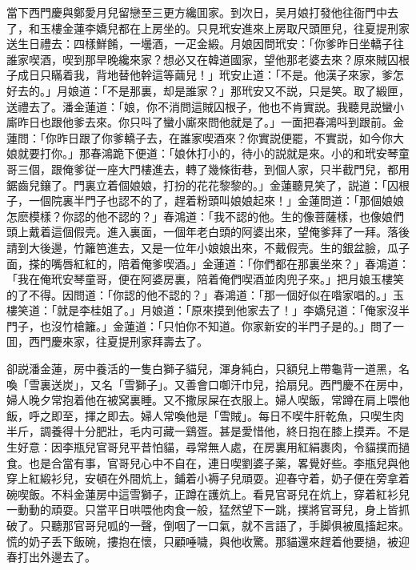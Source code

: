 當下西門慶與鄭愛月兒留戀至三更方纔囬家。到次日，吴月娘打發他往衙門中去了，和玉樓金蓮李嬌兒都在上房坐的。只見玳安進來上房取尺頭匣兒，往夏提刑家送生日禮去：四樣鮮餚，一壜酒，一疋金緞。月娘因問玳安：「你爹昨日坐轎子往誰家喫酒，喫到那早晚纔來家？想必又在韓道國家，望他那老婆去來？原來賊囚根子成日只瞞着我，背地替他幹這等繭兒！」玳安止道：「不是。他漢子來家，爹怎好去的。」月娘道：「不是那裏，却是誰家？」那玳安又不説，只是笑。取了緞匣，送禮去了。潘金蓮道：「娘，你不消問這賊囚根子，他也不肯實説。我聽見説蠻小廝昨日也跟他爹去來。你只呌了蠻小廝來問他就是了。」一面把春鴻呌到跟前。金蓮問：「你昨日跟了你爹轎子去，在誰家喫酒來？你實説便罷，不實説，如今你大娘就要打你。」那春鴻跪下便道：「娘休打小的，待小的説就是來。小的和玳安琴童哥三個，跟俺爹従一座大門樓進去，轉了幾條街巷，到個人家，只半截門兒，都用鋸齒兒鑲了。門裏立着個娘娘，打扮的花花黎黎的。」金蓮聽見笑了，説道：「囚根子，一個院裏半門子也認不的了，趕着粉頭叫娘娘起來！」金蓮問道：「那個娘娘怎麽模樣？你認的他不認的？」春鴻道：「我不認的他。生的像菩薩樣，也像娘們頭上戴着這個假壳。進入裏面，一個年老白頭的阿婆出來，望俺爹拜了一拜。落後請到大後邊，竹籬笆進去，又是一位年小娘娘出來，不戴假壳。生的銀盆臉，瓜子面，搽的嘴唇紅紅的，陪着俺爹喫酒。」金蓮道：「你們都在那裏坐來？」春鴻道：「我在俺玳安琴童哥，便在阿婆房裏，陪着俺們喫酒並肉兜子來。」把月娘玉樓笑的了不得。因問道：「你認的他不認的？」春鴻道：「那一個好似在喒家唱的。」玉樓笑道：「就是李桂姐了。」月娘道：「原來摸到他家去了！」李嬌兒道：「俺家沒半門子，也沒竹槍籬。」金蓮道：「只怕你不知道。你家新安的半門子是的。」問了一囬，西門慶來家，往夏提刑家拜壽去了。

卻説潘金蓮，房中養活的一隻白獅子貓兒，渾身純白，只額兒上帶龜背一道黑，名喚「雪裏送炭」，又名「雪獅子」。又善會口啣汗巾兒，拾扇兒。西門慶不在房中，婦人晚夕常抱着他在被窝裏睡。又不撒尿屎在衣服上。婦人喫飯，常蹲在肩上喂他飯，呼之即至，揮之即去。婦人常喚他是「雪賊」。每日不喫牛肝乾魚，只喫生肉半斤，調養得十分肥壯，毛内可藏一鷄疍。甚是愛惜他，終日抱在膝上摸弄。不是生好意：因李瓶兒官哥兒平昔怕貓，尋常無人處，在房裏用紅絹裹肉，令貓撲而撾食。也是合當有事，官哥兒心中不自在，連日喫劉婆子薬，畧覺好些。李瓶兒與他穿上紅緞衫兒，安頓在外間炕上，鋪着小褥子兒頑耍。迎春守着，奶子便在旁拿着碗喫飯。不料金蓮房中這雪獅子，正蹲在護炕上。看見官哥兒在炕上，穿着紅衫兒一動動的頑耍。只當平日哄喂他肉食一般，猛然望下一跳，撲將官哥兒，身上皆抓破了。只聽那官哥兒呱的一聲，倒咽了一口氣，就不言語了，手脚俱被風搐起來。慌的奶子丢下飯碗，摟抱在懷，只顧唾噦，與他收驚。那貓還來趕着他要撾，被迎春打出外邊去了。

